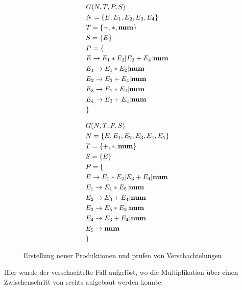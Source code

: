 \documentclass[runningheads]{llncs}
\begin{document}
	\begin{figure}
		\begin{minipage}{0.48\textwidth}
			\begin{flushleft}
				\begin{align*}
					& G(N,T,P,S) \\
					& N= \{E, E_1, E_2, E_3, E_4\} \\
					& T= \{+, *, \bold{num}\} \\
					& S= \{E\} \\
					& P = \{ \\
					& E     \rightarrow E_1 * E_2 | E_3 + E_4 | \bold{num} \\
					& E_1   \rightarrow E_1 * E_2 | \bold{num} \\
					& E_2   \rightarrow E_3 + E_4 | \bold{num} \\
					& E_3   \rightarrow E_1 * E_2 | \bold{num} \\
					& E_4   \rightarrow E_3 + E_4 | \bold{num} \\
					& \}
				\end{align*}
			\end{flushleft}
		\end{minipage}
		\hfill
		\begin{minipage}{0.48\textwidth}
			\begin{align*}
				& G(N,T,P,S) \\
				& N= \{E, E_1, E_2, E_3, E_4, E_5\} \\
				& T= \{+, *, \bold{num}\} \\
				& S= \{E\} \\
				& P = \{ \\
				& E     \rightarrow E_1 * E_2 | E_3 + E_4 | \bold{num} \\
				& E_1   \rightarrow E_1 * E_5 | \bold{num} \\
				& E_2   \rightarrow E_3 + E_4 | \bold{num} \\
				& E_3   \rightarrow E_5 * E_2 | \bold{num} \\
				& E_4   \rightarrow E_3 + E_4 | \bold{num} \\
				& E_5   \rightarrow \bold{num} \\
				& \}
			\end{align*}
		\end{minipage}
		\caption{Erstellung neuer Produktionen und prüfen von Verschachtelungen}
		\label{fig:figure9}
	\end{figure}

	Hier wurde der verschachtelte Fall aufgelöst, wo die Multiplikation über einen Zwischenschritt von rechts aufgebaut werden konnte.
\end{document}
